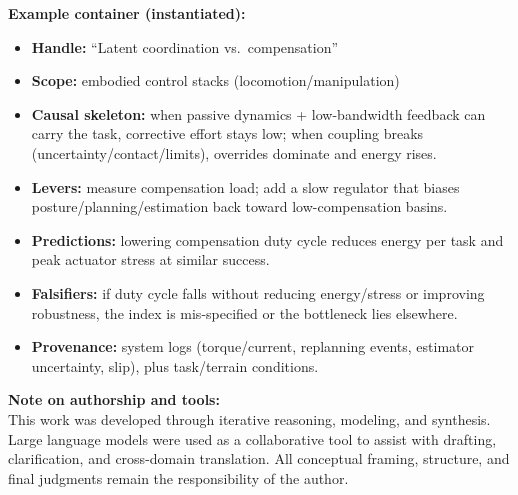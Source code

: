 \documentclass[11pt]{article}
\begin{document}
\noindent\textbf{Example container (instantiated):}\par
\begin{itemize}
\item \textbf{Handle:} “Latent coordination vs.\ compensation”
\item \textbf{Scope:} embodied control stacks (locomotion/manipulation)
\item \textbf{Causal skeleton:} when passive dynamics + low-bandwidth feedback can carry the task, corrective effort stays low; when coupling breaks (uncertainty/contact/limits), overrides dominate and energy rises.
\item \textbf{Levers:} measure compensation load; add a slow regulator that biases posture/\allowbreak planning/\allowbreak estimation back toward low-compensation basins.
\item \textbf{Predictions:} lowering compensation duty cycle reduces energy per task and peak actuator stress at similar success.
\item \textbf{Falsifiers:} if duty cycle falls without reducing energy/stress or improving robustness, the index is mis-specified or the bottleneck lies elsewhere.
\item \textbf{Provenance:} system logs (torque/current, replanning events, estimator uncertainty, slip), plus task/terrain conditions.
\end{itemize}

\newpage

{
\noindent\textbf{Note on authorship and tools:}\\
This work was developed through iterative reasoning, modeling, and synthesis.
Large language models were used as a collaborative tool to assist with drafting,
clarification, and cross-domain translation. All conceptual framing, structure,
and final judgments remain the responsibility of the author.
}
\end{document}
